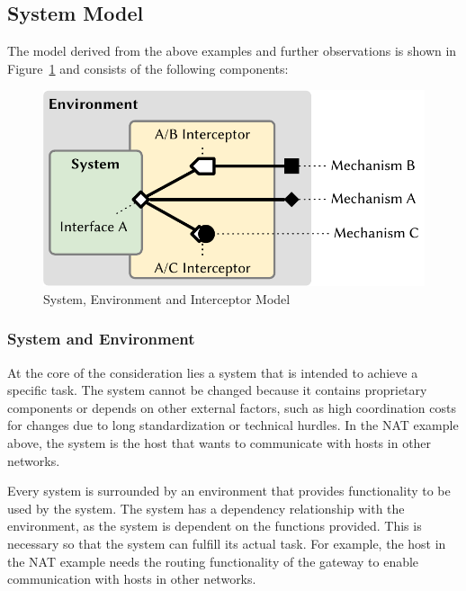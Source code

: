 \subsection{System Model}

The model derived from the above examples and further observations is shown in Figure~\ref{fig:bigpicture} and consists of the following components:
\begin{figure}
    \centering
    \includegraphics[width=.8\linewidth]{figures/MechanismMigration.pdf}
    \caption{System, Environment and Interceptor Model}
    \label{fig:bigpicture}
\end{figure}


\subsubsection{System and Environment}
At the core of the consideration lies a system that is intended to achieve a specific task.
The system cannot be changed because it contains proprietary components or depends on other external factors, such as high coordination costs for changes due to long standardization or technical hurdles.
In the NAT example above, the system is the host that wants to communicate with hosts in other networks.

Every system is surrounded by an environment that provides functionality to be used by the system.
The system has a dependency relationship with the environment, as the system is dependent on the functions provided.
This is necessary so that the system can fulfill its actual task.
For example, the host in the NAT example needs the routing functionality of the gateway to enable communication with hosts in other networks.

